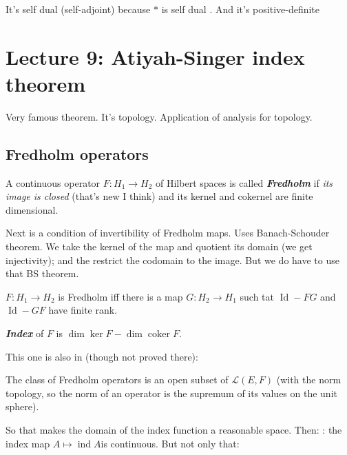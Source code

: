 \begin{remark}\leavevmode
It's self dual (self-adjoint) because \(*\) is self dual . And it's positive-definite 
\end{remark}

\section{Lecture 9: Atiyah-Singer index theorem}

Very famous theorem. It's topology. Application of analysis for topology.

\subsection{Fredholm operators}

\begin{defn}\leavevmode
A continuous operator \(F: H_1 \to H_2\) of Hilbert spaces is called \textit{\textbf{Fredholm}} if \textit{its image is closed} ({\color{6}that's new I think}) and its kernel and cokernel are finite dimensional. 
\end{defn}

Next is a condition of invertibility of Fredholm maps. Uses Banach-Schouder theorem. We take the kernel of the map and quotient its domain (we get injectivity); and the restrict the codomain to the image. But we do have to use that BS theorem.

\begin{claim}\leavevmode
\(F: H_1 \to H_2\) is Fredholm iff there is a map \(G:H_2 \to H_1\) such tat \(\operatorname{Id}-FG\) and \(\operatorname{Id}-GF\) have finite rank.
\end{claim}

\begin{defn}\leavevmode
\textit{\textbf{Index}} of \(F\) is \(\dim \ker F-\dim \operatorname{coker}F\).
\end{defn}

This one is also in \cite{brezis} (though not proved there):

\begin{prop}\leavevmode
The class of Fredholm operators is an open subset of \(\mathcal{L}(E,F)\) (with the norm topology, so the norm of an operator is the supremum of its values on the unit sphere).
\end{prop}

So that makes the domain of the index function a reasonable space. Then: \cite{brezis}: the index map \(A \mapsto  \operatorname{ind}A\)is continuous. But not only that:

